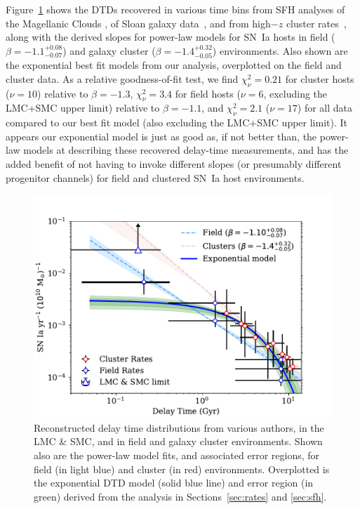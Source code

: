 \documentclass[apj]{aastex62}
\begin{document}
Figure~\ref{fig:logsnrate} shows the DTDs recovered in various time bins from SFH analyses of the Magellanic Clouds \citep{Maoz:2010}, of Sloan galaxy data~\citep{Maoz:2010a, Maoz:2011, Maoz:2012a,Graur:2013}, and from high$-z$ cluster rates~\citep{Friedmann:2018hq}, along with the derived slopes for power-law models for SN~Ia hosts in field ($\beta=-1.1^{+0.08}_{-0.07}$) and galaxy cluster ($\beta=-1.4^{+0.32}_{-0.05}$) environments. Also shown are the exponential best fit models from our analysis, overplotted on the field and cluster data. As a relative goodness-of-fit test, we find  $\chi^2_{\nu}=0.21$ for cluster hosts ($\nu=10$) relative to $\beta=-1.3$, $\chi^2_{\nu}=3.4$ for field hosts ($\nu=6$, excluding the LMC+SMC upper limit) relative to $\beta=-1.1$, and $\chi^2_{\nu}=2.1$ ($\nu=17$) for all data compared to our best fit model (also excluding the LMC+SMC upper limit). It appears our exponential model is just as good as, if not better than, the power-law models at describing these recovered delay-time measurements, and has the added benefit of not having to invoke different slopes (or presumably different progenitor channels) for field and clustered SN~Ia host environments.

\begin{figure}[t] 
   \centering
   \includegraphics[width=6.1in]{figure_loglog_dtd.pdf}
   \caption{\footnotesize Reconstructed delay time distributions from various authors, in the LMC \& SMC, and in field and galaxy cluster environments. Shown also are the power-law model fits, and associated error regions, for field (in light blue) and cluster (in red) environments. Overplotted is the exponential DTD model (solid blue line) and error region (in green) derived from the analysis in Sections~\ref{sec:rates} and \ref{sec:sfh}. }
   \label{fig:logsnrate}
\end{figure}
\end{document}
